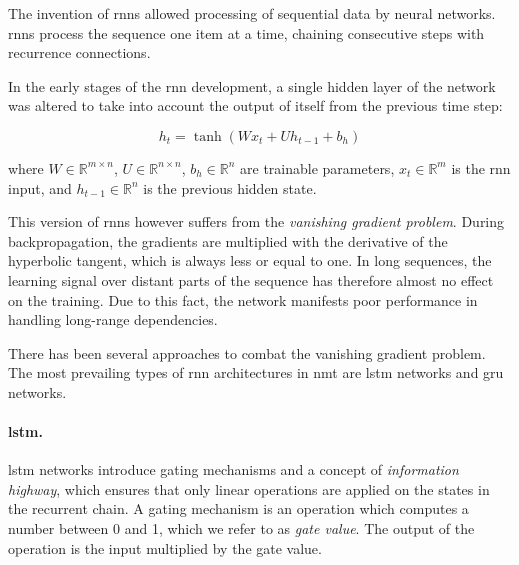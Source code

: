 The invention of \acp{rnn} \citep{elman1990finding} allowed processing of
sequential data by neural networks. \Acp{rnn} process the sequence one item at
a time, chaining consecutive steps with recurrence connections.

In the early stages of the \ac{rnn} development, a single hidden layer of the
network was altered to take into account the output of itself from the previous
time step:

%

\begin{equation} h_t = \tanh ( W x_t + U h_{t-1} + b_h ) \label{eq:vanilla-rnn}
\end{equation}

\noindent where $W \in \mathbb{R}^{m \times n}$,
$U \in \mathbb{R}^{n \times n}$, $b_h \in \mathbb{R}^{n}$ are trainable
parameters, $x_t \in \mathbb{R}^{m}$ is the \ac{rnn} input, and
$h_{t-1} \in \mathbb{R}^{n}$ is the previous hidden state.

This version of \acp{rnn} however suffers from the \emph{vanishing gradient
  problem}. During backpropagation, the gradients are multiplied with the
derivative of the hyperbolic tangent, which is always less or equal to one. In
long sequences, the learning signal over distant parts of the sequence has
therefore almost no effect on the training. Due to this fact, the network
manifests poor performance in handling long-range dependencies.

There has been several approaches to combat the vanishing gradient problem.
The most prevailing types of \ac{rnn} architectures in \ac{nmt} are \ac{lstm}
networks and \ac{gru} networks.

\paragraph{\acs{lstm}.} \acl{lstm} networks
\citep{hochreiter1997long,gers2000learning} introduce gating mechanisms and a
concept of \emph{information highway}, which ensures that only linear
operations are applied on the states in the recurrent chain. A gating mechanism
is an operation which computes a number between 0 and 1, which we refer to as
\emph{gate value}.  The output of the operation is the input multiplied by the
gate value.

